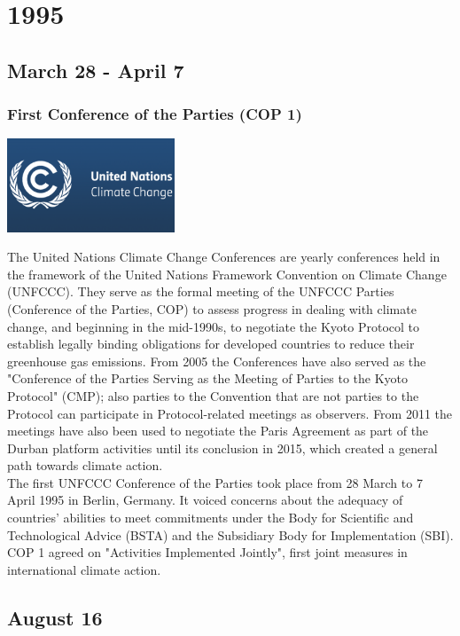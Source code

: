 \documentclass[11pt]{report}
\begin{document}
\chapter{1995}
\section{March 28 - April 7}
\subsection{First Conference of the Parties (COP 1)}
\vspace{2mm}\begin{center}\includegraphics[width=5cm]{./img/coplogo.png}\end{center}
The United Nations Climate Change Conferences are yearly conferences held in the framework of the United Nations Framework Convention on Climate Change (UNFCCC). They serve as the formal meeting of the UNFCCC Parties (Conference of the Parties, COP) to assess progress in dealing with climate change, and beginning in the mid-1990s, to negotiate the Kyoto Protocol to establish legally binding obligations for developed countries to reduce their greenhouse gas emissions. From 2005 the Conferences have also served as the "Conference of the Parties Serving as the Meeting of Parties to the Kyoto Protocol" (CMP); also parties to the Convention that are not parties to the Protocol can participate in Protocol-related meetings as observers. From 2011 the meetings have also been used to negotiate the Paris Agreement as part of the Durban platform activities until its conclusion in 2015, which created a general path towards climate action.\\

The first UNFCCC Conference of the Parties took place from 28 March to 7 April 1995 in Berlin, Germany. It voiced concerns about the adequacy of countries' abilities to meet commitments under the Body for Scientific and Technological Advice (BSTA) and the Subsidiary Body for Implementation (SBI). COP 1 agreed on "Activities Implemented Jointly", first joint measures in international climate action.

\section{August 16}
\end{document}

